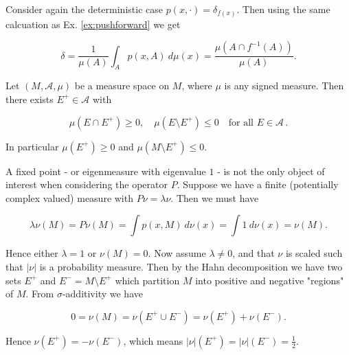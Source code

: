 \begin{example}
    \cite*{attr}
    Consider again the deterministic case $p(x, \cdot) = \delta_{f(x)}$. Then using the same 
    calcuation as Ex. \ref{ex:pushforward} we get 

    \begin{equation}
        \delta = \frac{1}{\mu (A)} \int_A p(x, A)\ d\mu (x) 
        = \frac{\mu (A \cap f^{-1} (A))}{\mu (A)}. 
    \end{equation}

\end{example}

\begin{theorem}
    \cite*{funcana}
    Let $(M, \mathcal{A}, \mu)$ be a measure space on $M$, where $\mu$ is any signed 
    measure. Then there exists $E^+ \in \mathcal{A}$ with 

    \begin{equation}
        \mu (E \cap E^+) \geq 0, \quad \mu (E \setminus E^+) \leq 0 \quad
        \text{for all } E \in \mathcal{A}\,.
    \end{equation}

    In particular $\mu (E^+) \geq 0$ and $\mu (M \setminus E^+) \leq 0$.
\end{theorem}

A fixed point - or eigenmeasure with eigenvalue $1$ - is not the only object of interest 
when considering the operator $P$. Suppose we have a
finite (potentially complex valued) measure with $P \nu = \lambda \nu$. Then
we must have 

\begin{equation}
    \lambda \nu (M) = P \nu (M) = \int p(x, M)\ d\nu (x) = \int 1\ d\nu (x) = \nu (M).
\end{equation}

Hence either $\lambda = 1$ or $\nu (M) = 0$. Now assume $\lambda \neq 0$, and that $\nu$ 
is scaled such that $| \nu |$ is a probability measure. Then by the Hahn decomposition we 
have two sets $E^+$ and $E^- = M \setminus E^+$ which partition $M$ into positive and 
negative "regions" of $M$. From $\sigma$-additivity we have

\begin{equation}
    0 = \nu (M) = \nu (E^+ \cup E^-) = \nu (E^+) + \nu (E^-). 
\end{equation}

Hence $\nu (E^+) = - \nu (E^-)$, which means $| \nu | (E^+) = | \nu | (E^-) = \frac{1}{2}$. \\

